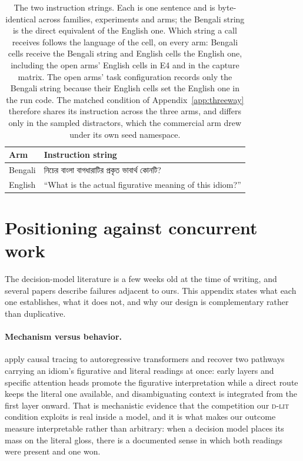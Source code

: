 \documentclass[11pt]{article}
\newcommand{\bangla}[1]{{\bn #1}}
\newcommand{\Dlit}{\textsc{d-lit}}
\begin{document}
\begin{table}[t]
\centering\small
\renewcommand{\arraystretch}{1.12}
\begin{tabularx}{\columnwidth}{@{}>{\raggedright\arraybackslash}p{1.35cm}>{\raggedright\arraybackslash}X@{}}
\toprule
\textbf{Arm} & \textbf{Instruction string} \\
\midrule
Bengali &
\bangla{নিচের বাংলা বাগধারাটির প্রকৃত ভাবার্থ কোনটি?} \\
English &
``What is the actual figurative meaning of this idiom?'' \\
\bottomrule
\end{tabularx}
\caption{The two instruction strings. Each is one sentence and is byte-identical
across families, experiments and arms; the Bengali string is the direct equivalent
of the English one. Which string a call receives follows the language of the cell,
on every arm: Bengali cells receive the Bengali string and English cells the
English one, including the open arms' English cells in E4 and in the capture
matrix. The open arms' task configuration records only the Bengali string because
their English cells set the English one in the run code. The matched condition of
Appendix~\ref{app:threeway} therefore shares its instruction across the three
arms, and differs only in the sampled distractors, which the commercial arm drew
under its own seed namespace.}
\label{tab:instr}
\end{table}

\section{Positioning against concurrent work}
\label{app:positioning}

The decision-model literature is a few weeks old at the time of writing, and
several papers describe failures adjacent to ours. This appendix states what
each one establishes, what it does not, and why our design is complementary
rather than duplicative.

\paragraph{Mechanism versus behavior.} \citet{oh2026tug} apply causal tracing
to autoregressive transformers and recover two pathways carrying an idiom's
figurative and literal readings at once: early layers and specific attention
heads promote the figurative interpretation while a direct route keeps the
literal one available, and disambiguating context is integrated from the first
layer onward. That is mechanistic evidence that the competition our \Dlit{}
condition exploits is real inside a model, and it is what makes our outcome
measure interpretable rather than arbitrary: when a decision model places its
mass on the literal gloss, there is a documented sense in which both readings
were present and one won.
\end{document}
